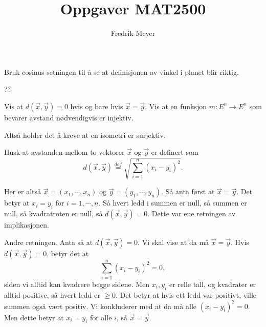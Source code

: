 \documentclass[11pt, norsk]{article}
\begin{document}
\title{Oppgaver MAT2500}
\author{Fredrik Meyer}
\maketitle 

\begin{oppg}
Bruk cosinus-setningen til å se at definisjonen av vinkel i planet blir riktig.
\end{oppg}
\begin{losn}
??
\end{losn}

\begin{oppg}
Vis at $d(\vec x, \vec y) = 0$ hvis og bare hvis $\vec x = \vec y$. Vis at en funksjon $m:E^n \to E^n$ som bevarer avstand nødvendigvis er injektiv.

Altså holder det å kreve at en isometri er surjektiv.
\end{oppg}
\begin{losn}
Husk at avstanden mellom to vektorer $\vec x$ og $\vec y$ er definert som $$d(\vec x,\vec y) \stackrel{def}{=} \sqrt{ \sum_{i=1}^n (x_i-y_i)^2 }.$$

Her er altså $\vec x = (x_1,\cdots,x_n)$ og $\vec y = (y_1,\cdots,y_n)$. Så anta først at $\vec x = \vec y$. Det betyr at $x_i=y_i$ for $i=1,\cdots,n$. Så hvert ledd i summen er null, så summen er null, så kvadratroten er null, så $d(\vec x, \vec y)=0$. Dette var ene retningen av implikasjonen.

Andre retningen. Anta så at $d(\vec x, \vec y)=0$. Vi skal vise at da må $\vec x = \vec y$. Hvis $d(\vec x,\vec y)=0$, betyr det at 
\[
\sum_{i=1}^n (x_i-y_i)^2 = 0,
\]
siden vi alltid kan kvadrere begge sidene. Men $x_i,y_i$ er relle tall, og kvadrater er alltid positive, så hvert ledd er $\geq 0$. Det betyr at hvis ett ledd var positivt, ville summen også vært positiv. Vi konkluderer med at da må alle $(x_i-y_i)^2=0$. Men dette betyr at $x_i=y_i$ for alle $i$, så $\vec x = \vec y$.
\end{losn}
\end{document}
